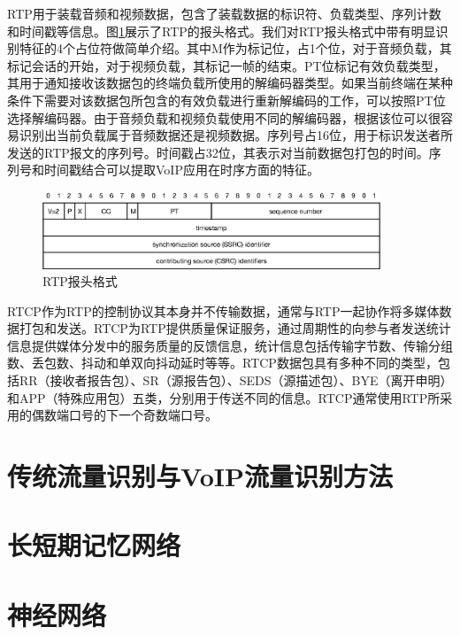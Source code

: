 RTP用于装载音频和视频数据，包含了装载数据的标识符、负载类型、序列计数和时间戳等信息。图\ref{fig:rtp}展示了RTP的报头格式。我们对RTP报头格式中带有明显识别特征的4个占位符做简单介绍。其中M作为标记位，占1个位，对于音频负载，其标记会话的开始，对于视频负载，其标记一帧的结束。PT位标记有效负载类型，其用于通知接收该数据包的终端负载所使用的解编码器类型。如果当前终端在某种条件下需要对该数据包所包含的有效负载进行重新解编码的工作，可以按照PT位选择解编码器。由于音频负载和视频负载使用不同的解编码器，根据该位可以很容易识别出当前负载属于音频数据还是视频数据。序列号占16位，用于标识发送者所发送的RTP报文的序列号。时间戳占32位，其表示对当前数据包打包的时间。序列号和时间戳结合可以提取VoIP应用在时序方面的特征。

\begin{figure}[thb]
\begin{center}
\includegraphics[width=0.9\textwidth]{figures/rtp.eps}
\caption{RTP报头格式}\label{fig:rtp}
\end{center}
\end{figure}

RTCP作为RTP的控制协议其本身并不传输数据，通常与RTP一起协作将多媒体数据打包和发送。RTCP为RTP提供质量保证服务，通过周期性的向参与者发送统计信息提供媒体分发中的服务质量的反馈信息，统计信息包括传输字节数、传输分组数、丢包数、抖动和单双向抖动延时等等。RTCP数据包具有多种不同的类型，包括RR（接收者报告包）、SR（源报告包）、SEDS（源描述包）、BYE（离开申明）和APP（特殊应用包）五类，分别用于传送不同的信息。RTCP通常使用RTP所采用的偶数端口号的下一个奇数端口号。





\section{传统流量识别与VoIP流量识别方法}

\section{长短期记忆网络}

\section{神经网络}

